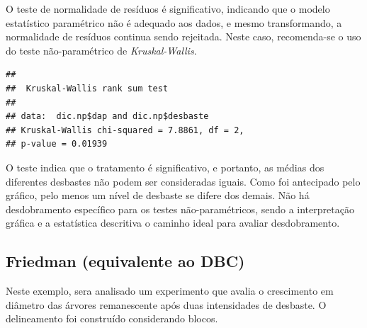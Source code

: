 \documentclass[
]{article}
\newenvironment{Shaded}{\begin{snugshade}}{\end{snugshade}}
\newcommand{\KeywordTok}[1]{\textcolor[rgb]{0.13,0.29,0.53}{\textbf{#1}}}
\newcommand{\NormalTok}[1]{#1}
\newcommand{\OperatorTok}[1]{\textcolor[rgb]{0.81,0.36,0.00}{\textbf{#1}}}
\begin{document}
O teste de normalidade de resíduos é significativo, indicando que o modelo estatístico paramétrico não é adequado aos dados, e mesmo transformando, a normalidade de resíduos continua sendo rejeitada. Neste caso, recomenda-se o uso do teste não-paramétrico de \emph{Kruskal-Wallis}.

\begin{Shaded}
\end{Shaded}

\begin{verbatim}
## 
##  Kruskal-Wallis rank sum test
## 
## data:  dic.np$dap and dic.np$desbaste
## Kruskal-Wallis chi-squared = 7.8861, df = 2,
## p-value = 0.01939
\end{verbatim}

O teste indica que o tratamento é significativo, e portanto, as médias dos diferentes desbastes não podem ser consideradas iguais. Como foi antecipado pelo gráfico, pelo menos um nível de desbaste se difere dos demais. Não há desdobramento específico para os testes não-paramétricos, sendo a interpretação gráfica e a estatística descritiva o caminho ideal para avaliar desdobramento.

\hypertarget{friedman-equivalente-ao-dbc}{%
\subsection{Friedman (equivalente ao DBC)}\label{friedman-equivalente-ao-dbc}}

Neste exemplo, sera analisado um experimento que avalia o crescimento em diâmetro das árvores remanescente após duas intensidades de desbaste. O delineamento foi construído considerando blocos.
\end{document}
